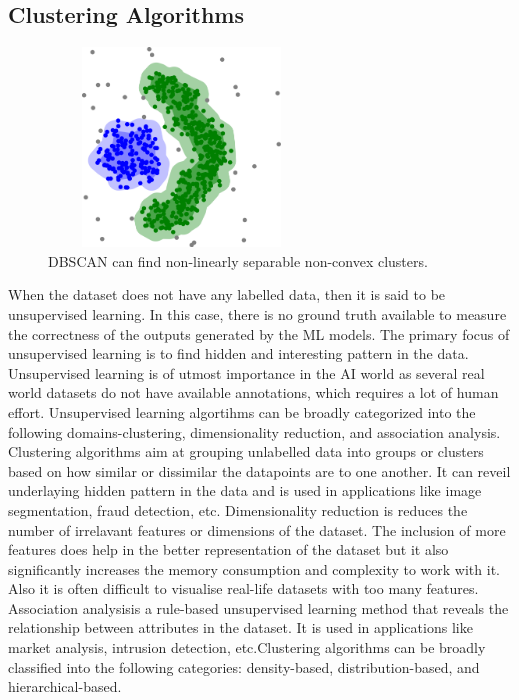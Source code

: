 \subsection{Clustering Algorithms}
\begin{figure}[t]
  \centering
  \includegraphics[width=200pt,height=150pt]{pictures/DBSCAN-density-data.png}
  \caption{\ac{DBSCAN} can find non-linearly separable non-convex clusters.\cite{dbscanWiki}}
  \label{fig:dbscan}
\end{figure} 
When the dataset does not have any labelled data, then it is said to be unsupervised learning. In this case, there is no ground truth available to measure the correctness of the outputs generated by the \ac{ML} models. The primary focus of unsupervised learning is to find hidden and interesting pattern in the data. Unsupervised learning is of utmost importance in the \ac{AI} world as several real world datasets do not have available annotations, which requires a lot of human effort. Unsupervised learning algortihms can be broadly categorized into the following domains-clustering, dimensionality reduction, and association analysis. Clustering algorithms aim at grouping unlabelled data into groups or clusters based on how similar or dissimilar the datapoints are to one another. It can reveil underlaying hidden pattern in the data and is used in applications like image segmentation, fraud detection, etc. Dimensionality reduction is reduces the number of irrelavant features or dimensions of the dataset. The inclusion of more features does help in the better representation of the dataset but it also significantly increases the memory consumption and complexity to work with it. Also it is often difficult to visualise real-life datasets with too many features. Association analysisis a rule-based unsupervised learning method that reveals the relationship between attributes in the dataset. It is used in applications like market analysis, intrusion detection, etc.Clustering algorithms can be broadly classified into the following categories: density-based, distribution-based, and hierarchical-based.\\
